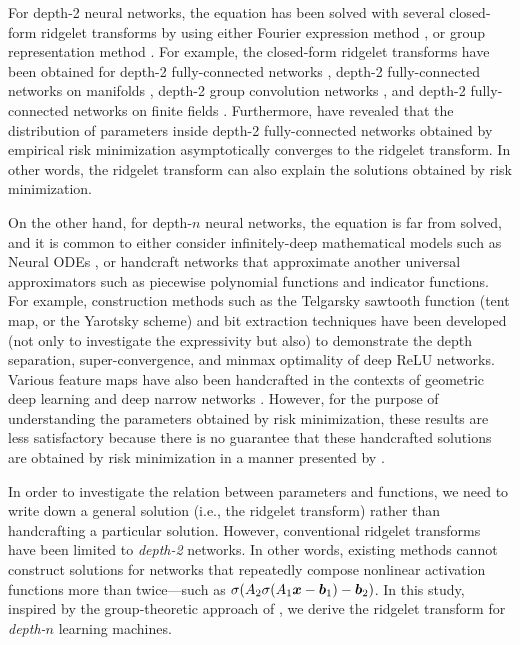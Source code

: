 For depth-2 neural networks, the equation has been solved with several closed-form ridgelet transforms by using either Fourier expression method \citep{Sonoda2024fourier}, or group representation method \citep{sonoda2023joint}. For example, the closed-form ridgelet transforms have been obtained for depth-2 fully-connected networks \citep{Sonoda2021ghost}, depth-2 fully-connected networks on manifolds \citep{Sonoda2022symmetric}, depth-2 group convolution networks \citep{Sonoda2022gconv}, and depth-2 fully-connected networks on finite fields \citep{Yamasaki2023icml}.
Furthermore, \citet{Sonoda2021aistats} have revealed that the distribution of parameters inside depth-2 fully-connected networks obtained by empirical risk minimization asymptotically converges to the ridgelet transform. In other words, the ridgelet transform can also explain the solutions obtained by risk minimization.

On the other hand, for depth-$n$ neural networks, the equation is far from solved, and it is common to either consider infinitely-deep mathematical models such as Neural ODEs \citep{Sonoda2017otml,E2017,Li2018b,Haber2017,Chen2018a}, or handcraft networks that approximate another universal approximators such as piecewise polynomial functions and indicator functions.
For example, construction methods such as the Telgarsky sawtooth function (tent map, or the Yarotsky scheme) and bit extraction techniques
\citep{Cohen2016,Telgarsky2016,Yarotsky2017,Yarotsky2018,Yarotsky2020,Daubechies2022,Cohen2022,Siegel2023,Petrova2023,Grohs2023}
have been developed (not only to investigate the expressivity but also) to demonstrate the depth separation, super-convergence, and minmax optimality of deep ReLU networks. Various feature maps have also been handcrafted in the contexts of
geometric deep learning \citep{Bronstein2021gdl} and deep narrow networks \citep{Lu2017expressive,Hanin2017,Lin2018,Kidger2020,park2021minimum,Li2023minimum,cai2023achieve,kim2024minimum}. However, for the purpose of understanding the parameters obtained by risk minimization, these results are less satisfactory because there is no guarantee that these handcrafted solutions are obtained by risk minimization in a manner presented by \citet{Sonoda2021aistats}.


In order to investigate the relation between parameters and functions, we need to write down a general solution (i.e., the ridgelet transform) rather than handcrafting a particular solution. However, conventional ridgelet transforms have been limited to \emph{depth-2} networks. In other words, existing methods cannot construct solutions for networks that repeatedly compose nonlinear activation functions more than twice---such as $\sigma(A_2 \sigma(A_1 \bm{x} - \bm{b}_1) - \bm{b}_2)$. In this study, inspired by the group-theoretic approach of \citet{sonoda2023joint}, we derive the ridgelet transform for \emph{depth-$n$} learning machines.


